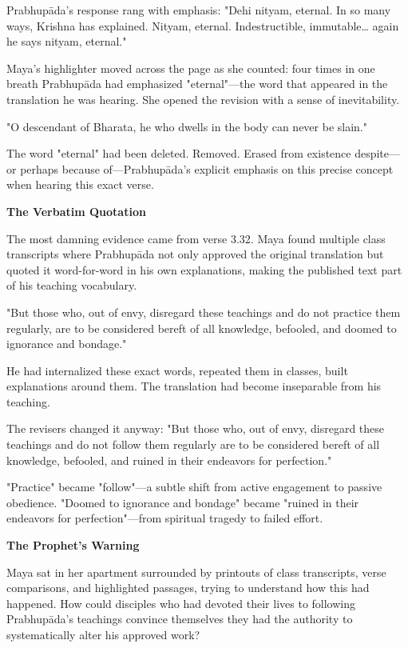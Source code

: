 \documentclass[12pt,twoside]{book}
\begin{document}
Prabhupāda's response rang with emphasis: "Dehi nityam, eternal. In so many ways, Krishna has explained. Nityam, eternal. Indestructible, immutable\ldots{} again he says nityam, eternal."

Maya's highlighter moved across the page as she counted: four times in one breath Prabhupāda had emphasized "eternal"—the word that appeared in the translation he was hearing. She opened the revision with a sense of inevitability.

"O descendant of Bharata, he who dwells in the body can never be slain."

The word "eternal" had been deleted. Removed. Erased from existence despite—or perhaps because of—Prabhupāda's explicit emphasis on this precise concept when hearing this exact verse.


\vspace{0.5cm}
\textbf{The Verbatim Quotation}
\vspace{0.2cm}


The most damning evidence came from verse 3.32. Maya found multiple class transcripts where Prabhupāda not only approved the original translation but quoted it word-for-word in his own explanations, making the published text part of his teaching vocabulary.

"But those who, out of envy, disregard these teachings and do not practice them regularly, are to be considered bereft of all knowledge, befooled, and doomed to ignorance and bondage."

He had internalized these exact words, repeated them in classes, built explanations around them. The translation had become inseparable from his teaching.

The revisers changed it anyway: "But those who, out of envy, disregard these teachings and do not follow them regularly are to be considered bereft of all knowledge, befooled, and ruined in their endeavors for perfection."

"Practice" became "follow"—a subtle shift from active engagement to passive obedience. "Doomed to ignorance and bondage" became "ruined in their endeavors for perfection"—from spiritual tragedy to failed effort.


\vspace{0.5cm}
\textbf{The Prophet's Warning}
\vspace{0.2cm}


Maya sat in her apartment surrounded by printouts of class transcripts, verse comparisons, and highlighted passages, trying to understand how this had happened. How could disciples who had devoted their lives to following Prabhupāda's teachings convince themselves they had the authority to systematically alter his approved work?
\end{document}
